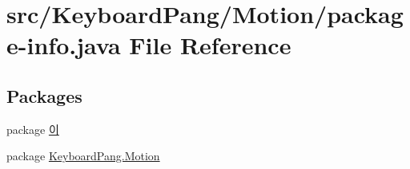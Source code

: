 \hypertarget{_keyboard_pang_2_motion_2package-info_8java}{\section{src/\-Keyboard\-Pang/\-Motion/package-\/info.java File Reference}
\label{_keyboard_pang_2_motion_2package-info_8java}
}
\subsection*{Packages}
\begin{DoxyCompactItemize}
\item 
package \hyperlink{namespace_xEC_x9D_xB4}{이}
\item 
package \hyperlink{namespace_keyboard_pang_1_1_motion}{Keyboard\-Pang.\-Motion}
\end{DoxyCompactItemize}
